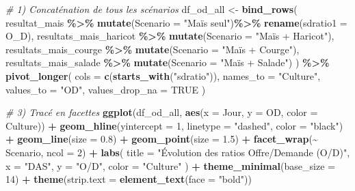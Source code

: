 \documentclass[
]{article}
\newenvironment{Shaded}{\begin{snugshade}}{\end{snugshade}}
\newcommand{\AttributeTok}[1]{\textcolor[rgb]{0.13,0.29,0.53}{#1}}
\newcommand{\CommentTok}[1]{\textcolor[rgb]{0.56,0.35,0.01}{\textit{#1}}}
\newcommand{\ConstantTok}[1]{\textcolor[rgb]{0.56,0.35,0.01}{#1}}
\newcommand{\DecValTok}[1]{\textcolor[rgb]{0.00,0.00,0.81}{#1}}
\newcommand{\FloatTok}[1]{\textcolor[rgb]{0.00,0.00,0.81}{#1}}
\newcommand{\FunctionTok}[1]{\textcolor[rgb]{0.13,0.29,0.53}{\textbf{#1}}}
\newcommand{\NormalTok}[1]{#1}
\newcommand{\OtherTok}[1]{\textcolor[rgb]{0.56,0.35,0.01}{#1}}
\newcommand{\SpecialCharTok}[1]{\textcolor[rgb]{0.81,0.36,0.00}{\textbf{#1}}}
\newcommand{\StringTok}[1]{\textcolor[rgb]{0.31,0.60,0.02}{#1}}
\begin{document}
\begin{Shaded}
\begin{Highlighting}[]
\CommentTok{\# 1) Concaténation de tous les scénarios}
\NormalTok{df\_od\_all }\OtherTok{\textless{}{-}} \FunctionTok{bind\_rows}\NormalTok{(}
\NormalTok{  resultat\_mais               }\SpecialCharTok{\%\textgreater{}\%} \FunctionTok{mutate}\NormalTok{(}\AttributeTok{Scenario =} \StringTok{"Maïs seul"}\NormalTok{)}\SpecialCharTok{\%\textgreater{}\%} \FunctionTok{rename}\NormalTok{(}\AttributeTok{sdratio1 =}\NormalTok{ O\_D),}
\NormalTok{  resultats\_mais\_haricot      }\SpecialCharTok{\%\textgreater{}\%} \FunctionTok{mutate}\NormalTok{(}\AttributeTok{Scenario =} \StringTok{"Maïs + Haricot"}\NormalTok{),}
\NormalTok{  resultats\_mais\_courge       }\SpecialCharTok{\%\textgreater{}\%} \FunctionTok{mutate}\NormalTok{(}\AttributeTok{Scenario =} \StringTok{"Maïs + Courge"}\NormalTok{),}
\NormalTok{  resultats\_mais\_salade       }\SpecialCharTok{\%\textgreater{}\%} \FunctionTok{mutate}\NormalTok{(}\AttributeTok{Scenario =} \StringTok{"Maïs + Salade"}\NormalTok{)}
\NormalTok{) }\SpecialCharTok{\%\textgreater{}\%}
  \FunctionTok{pivot\_longer}\NormalTok{(}
    \AttributeTok{cols =} \FunctionTok{c}\NormalTok{(}\FunctionTok{starts\_with}\NormalTok{(}\StringTok{"sdratio"}\NormalTok{)),}
    \AttributeTok{names\_to  =} \StringTok{"Culture"}\NormalTok{,}
    \AttributeTok{values\_to =} \StringTok{"OD"}\NormalTok{,}
    \AttributeTok{values\_drop\_na =} \ConstantTok{TRUE}
\NormalTok{  )}

\CommentTok{\# 3) Tracé en facettes}
\FunctionTok{ggplot}\NormalTok{(df\_od\_all, }\FunctionTok{aes}\NormalTok{(}\AttributeTok{x =}\NormalTok{ Jour, }\AttributeTok{y =}\NormalTok{ OD, }\AttributeTok{color =}\NormalTok{ Culture)) }\SpecialCharTok{+}
  \FunctionTok{geom\_hline}\NormalTok{(}\AttributeTok{yintercept =} \DecValTok{1}\NormalTok{, }\AttributeTok{linetype =} \StringTok{"dashed"}\NormalTok{, }\AttributeTok{color =} \StringTok{"black"}\NormalTok{) }\SpecialCharTok{+}
  \FunctionTok{geom\_line}\NormalTok{(}\AttributeTok{size =} \FloatTok{0.8}\NormalTok{) }\SpecialCharTok{+}
  \FunctionTok{geom\_point}\NormalTok{(}\AttributeTok{size =} \FloatTok{1.5}\NormalTok{) }\SpecialCharTok{+}
  \FunctionTok{facet\_wrap}\NormalTok{(}\SpecialCharTok{\textasciitilde{}}\NormalTok{ Scenario, }\AttributeTok{ncol =} \DecValTok{2}\NormalTok{) }\SpecialCharTok{+}
  \FunctionTok{labs}\NormalTok{(}
    \AttributeTok{title =} \StringTok{"Évolution des ratios Offre/Demande (O/D)"}\NormalTok{,}
    \AttributeTok{x     =} \StringTok{"DAS"}\NormalTok{,}
    \AttributeTok{y     =} \StringTok{"O/D"}\NormalTok{,}
    \AttributeTok{color =} \StringTok{"Culture"}
\NormalTok{  ) }\SpecialCharTok{+}
  \FunctionTok{theme\_minimal}\NormalTok{(}\AttributeTok{base\_size =} \DecValTok{14}\NormalTok{) }\SpecialCharTok{+}
  \FunctionTok{theme}\NormalTok{(}\AttributeTok{strip.text =} \FunctionTok{element\_text}\NormalTok{(}\AttributeTok{face =} \StringTok{"bold"}\NormalTok{))}
\end{Highlighting}
\end{Shaded}
\end{document}
